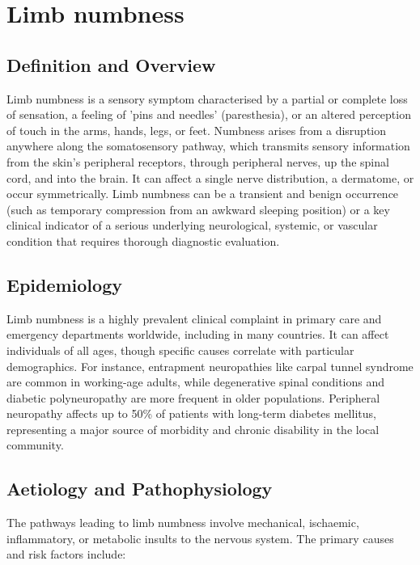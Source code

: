 \chapter{Limb numbness}

\section*{Definition and Overview}
Limb numbness is a sensory symptom characterised by a partial or complete loss of sensation, a feeling of 'pins and needles' (paresthesia), or an altered perception of touch in the arms, hands, legs, or feet. Numbness arises from a disruption anywhere along the somatosensory pathway, which transmits sensory information from the skin's peripheral receptors, through peripheral nerves, up the spinal cord, and into the brain. It can affect a single nerve distribution, a dermatome, or occur symmetrically. Limb numbness can be a transient and benign occurrence (such as temporary compression from an awkward sleeping position) or a key clinical indicator of a serious underlying neurological, systemic, or vascular condition that requires thorough diagnostic evaluation.

\section*{Epidemiology}
Limb numbness is a highly prevalent clinical complaint in primary care and emergency departments worldwide, including in many countries. It can affect individuals of all ages, though specific causes correlate with particular demographics. For instance, entrapment neuropathies like carpal tunnel syndrome are common in working-age adults, while degenerative spinal conditions and diabetic polyneuropathy are more frequent in older populations. Peripheral neuropathy affects up to 50\% of patients with long-term diabetes mellitus, representing a major source of morbidity and chronic disability in the local community.

\section*{Aetiology and Pathophysiology}
The pathways leading to limb numbness involve mechanical, ischaemic, inflammatory, or metabolic insults to the nervous system. The primary causes and risk factors include:


